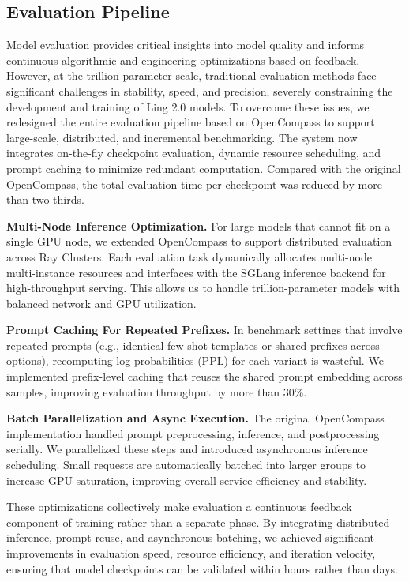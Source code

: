 \subsection{Evaluation Pipeline}
Model evaluation provides critical insights into model quality and informs continuous algorithmic and engineering optimizations based on feedback. However, at the trillion-parameter scale, traditional evaluation methods face significant challenges in stability, speed, and precision, severely constraining the development and training of  Ling 2.0 models.
To overcome these issues, we redesigned the entire evaluation pipeline based on OpenCompass \citep{2023opencompass} to support large-scale, distributed, and incremental benchmarking. The system now integrates on-the-fly checkpoint evaluation, dynamic resource scheduling, and prompt caching to minimize redundant computation. Compared with the original OpenCompass, the total evaluation time per checkpoint was reduced by more than two-thirds.

\textbf{Multi-Node Inference Optimization.} For large models that cannot fit on a single GPU node, we extended OpenCompass to support distributed evaluation across Ray Clusters. Each evaluation task dynamically allocates multi-node multi-instance resources and interfaces with the SGLang \citep{zheng2024sglang} inference backend for high-throughput serving. This allows us to handle trillion-parameter models with balanced network and GPU utilization.

\textbf{Prompt Caching For Repeated Prefixes.} In benchmark settings that involve repeated prompts (e.g., identical few-shot templates or shared prefixes across options), recomputing log-probabilities (PPL) for each variant is wasteful. We implemented prefix-level caching that reuses the shared prompt embedding across samples, improving evaluation throughput by more than 30\%.

\textbf{Batch Parallelization and Async Execution.} The original OpenCompass implementation handled prompt preprocessing, inference, and postprocessing serially. We parallelized these steps and introduced asynchronous inference scheduling. Small requests are automatically batched into larger groups to increase GPU saturation, improving overall service efficiency and stability.

These optimizations collectively make evaluation a continuous feedback component of training rather than a separate phase. By integrating distributed inference, prompt reuse, and asynchronous batching, we achieved significant improvements in evaluation speed, resource efficiency, and iteration velocity, ensuring that model checkpoints can be validated within hours rather than days.

